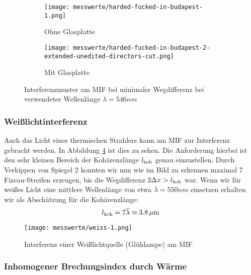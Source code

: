 			\begin{figure}[htb]
				\begin{subfigure}[b]{.5\textwidth}
					\centering
					\texttt{[image: messwerte/harded-fucked-in-budapest-1.png]}
					\caption{Ohne Glasplatte}
					\label{fig:ohne_platte}
				\end{subfigure}
				\begin{subfigure}[b]{.5\textwidth}
					\centering
					\texttt{[image: messwerte/harded-fucked-in-budapest-2-extended-unedited-directors-cut.png]}
					\caption{Mit Glasplatte}
					\label{fig:mit_platte}
				\end{subfigure}
				\caption{Interferenzmuster am MIF bei minimaler Wegdifferenz bei verwendeter Wellenlänge $\lambda = 546\unit{nm}$}
			\end{figure}
		

		\subsubsection{Weißlichtinterferenz} %
		\label{ssub:wei_lichtinterferenz}

			Auch das Licht eines thermischen Strahlers kann am MIF zur Interferenz gebracht werden.
			In Abbildung \ref{fig:weiss} ist dies zu sehen.
			Die Anforderung hierbei ist den sehr kleinen Bereich der Kohärenzlänge $l_{\mathrm{koh}}$ genau einzustellen.
			Durch Verkippen von Spiegel 2 konnten wir nun wie im Bild zu erkennen maximal 7 Fizeau-Streifen erzeugen, bis die Wegdifferenz $2 \Delta x > l_{\mathrm{koh}}$ war.
			Wenn wir für weißes Licht eine mittlere Wellenlänge von etwa $\overline{\lambda} = 550 \unit{nm} $ einsetzen erhalten wir als Abschätzung für die Kohärenzlänge:
			\[ l_{\mathrm{koh}} = 7 \overline{\lambda} \approx 3.8\,\mu\mathrm{m} \]

			\begin{figure}[htb]
				\centering
				\texttt{[image: messwerte/weiss-1.png]}
				\caption{Interferenz einer Weißlichtquelle (Glühlampe) am MIF}
				\label{fig:weiss}
			\end{figure}



		\subsubsection{Inhomogener Brechungsindex durch Wärme} %
		\label{ssub:inhomogener_brechungsindex_durch_w_rme}
			
